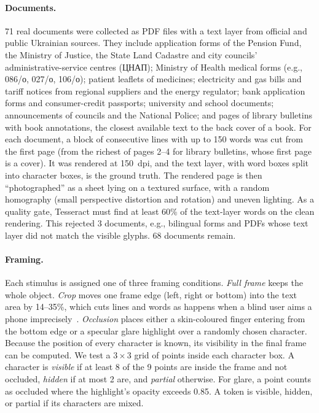 \documentclass[pdflatex,sn-mathphys-num]{sn-jnl}%
\theoremstyle{thmstyleone}%
\theoremstyle{thmstyletwo}%
\theoremstyle{thmstylethree}%
\newcommand{\NDoc}{68}
\newcommand{\NDocsCollected}{71}
\newcommand{\NDocsRejected}{3}
\begin{document}
\paragraph{Documents.} \NDocsCollected{} real documents were collected as PDF files with a text layer from official and public Ukrainian sources. They include application forms of the Pension Fund, the Ministry of Justice, the State Land Cadastre and city councils' administrative-service centres (ЦНАП); Ministry of Health medical forms (e.g., 086/о, 027/о, 106/о); patient leaflets of medicines; electricity and gas bills and tariff notices from regional suppliers and the energy regulator; bank application forms and consumer-credit passports; university and school documents; announcements of councils and the National Police; and pages of library bulletins with book annotations, the closest available text to the back cover of a book. For each document, a block of consecutive lines with up to 150 words was cut from the first page (from the richest of pages 2--4 for library bulletins, whose first page is a cover). It was rendered at 150~dpi, and the text layer, with word boxes split into character boxes, is the ground truth. The rendered page is then ``photographed'' as a sheet lying on a textured surface, with a random homography (small perspective distortion and rotation) and uneven lighting. As a quality gate, Tesseract must find at least 60\% of the text-layer words on the clean rendering. This rejected \NDocsRejected{} documents, e.g., bilingual forms and PDFs whose text layer did not match the visible glyphs. \NDoc{} documents remain.

\paragraph{Framing.} Each stimulus is assigned one of three framing conditions. \emph{Full frame} keeps the whole object. \emph{Crop} moves one frame edge (left, right or bottom) into the text area by 14--35\%, which cuts lines and words as happens when a blind user aims a phone imprecisely~\cite{gurari2018vizwiz}. \emph{Occlusion} places either a skin-coloured finger entering from the bottom edge or a specular glare highlight over a randomly chosen character. Because the position of every character is known, its visibility in the final frame can be computed. We test a $3\times3$ grid of points inside each character box. A character is \emph{visible} if at least 8 of the 9 points are inside the frame and not occluded, \emph{hidden} if at most 2 are, and \emph{partial} otherwise. For glare, a point counts as occluded where the highlight's opacity exceeds 0.85. A token is visible, hidden, or partial if its characters are mixed. 
\end{document}

